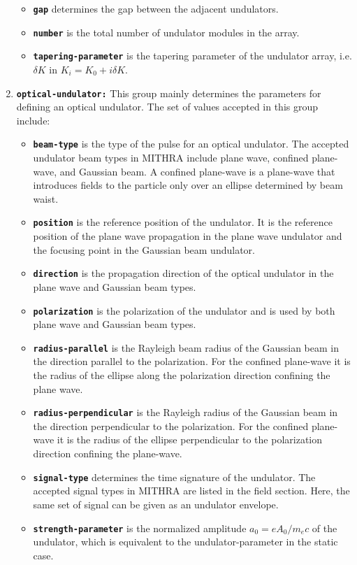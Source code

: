 \begin{enumerate}
\begin{itemize}
	\item \textbf{\texttt{gap}} determines the gap between the adjacent undulators.
    \item \textbf{\texttt{number}} is the total number of undulator modules in the array.
    \item \textbf{\texttt{tapering-parameter}} is the tapering parameter of the undulator array, i.e. $\delta K$ in $K_i=K_0+i \delta K$. 
\end{itemize}
\item \textbf{\texttt{optical-undulator:}} This group mainly determines the parameters for defining an optical undulator. The set of values accepted in this group include:
\begin{itemize}
	\item \textbf{\texttt{beam-type}} is the type of the pulse for an optical undulator. The accepted undulator beam types in MITHRA include plane wave, confined plane-wave, and Gaussian beam. A confined plane-wave is a plane-wave that introduces fields to the particle only over an ellipse determined by beam waist.
	\item \textbf{\texttt{position}} is the reference position of the undulator. It is the reference position of the plane wave propagation in the plane wave undulator and the focusing point in the Gaussian beam undulator.
	\item \textbf{\texttt{direction}} is the propagation direction of the optical undulator in the plane wave and Gaussian beam types.
	\item \textbf{\texttt{polarization}} is the polarization of the undulator and is used by both plane wave and Gaussian beam types.
	\item \textbf{\texttt{radius-parallel}} is the Rayleigh beam radius of the Gaussian beam in the direction parallel to the polarization. For the confined plane-wave it is the radius of the ellipse along the polarization direction confining the plane wave.
	\item \textbf{\texttt{radius-perpendicular}} is the Rayleigh radius of the Gaussian beam in the direction perpendicular to the polarization. For the confined plane-wave it is the radius of the ellipse perpendicular to the polarization direction confining the plane-wave.
	\item \textbf{\texttt{signal-type}} determines the time signature of the undulator. The accepted signal types in MITHRA are listed in the field section. Here, the same set of signal can be given as an undulator envelope.
	\item \textbf{\texttt{strength-parameter}} is the normalized amplitude $a_0 = e A_0 / m_ec $ of the undulator, which is equivalent to the undulator-parameter in the static case.

\end{itemize}
\end{enumerate}
